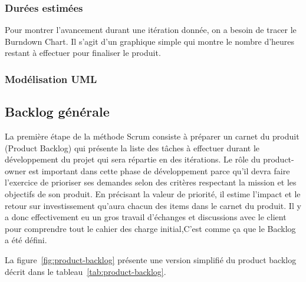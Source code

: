 \subsubsection{Durées estimées}
Pour montrer l’avancement durant une itération donnée, on a besoin de tracer le
Burndown Chart. Il s’agit d’un graphique simple qui montre le nombre d’heures restant
à effectuer pour finaliser le produit. 
\subsubsection{Modélisation UML}
\subsection{Backlog générale}
La première étape de la méthode Scrum consiste à préparer un carnet du produit
(Product Backlog) qui présente la liste des tâches à effectuer durant le développement
du projet qui sera répartie en des itérations. Le rôle du product-owner est important
dans cette phase de développement parce qu’il devra faire l’exercice de prioriser ses
demandes selon des critères respectant la mission et les objectifs de son produit. En
précisant la valeur de priorité, il estime l’impact et le retour sur investissement 
qu’aura chacun des items dans le carnet du produit.
Il y a donc effectivement eu un gros travail
d’échanges et discussions avec le client pour comprendre tout le cahier des charge
initial,C’est comme ça que le Backlog a été défini.

La figure~\ref{fig:product-backlog} présente une version simplifié du product
backlog décrit dans le tableau~\ref{tab:product-backlog}.


